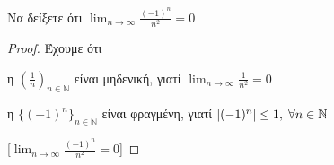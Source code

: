 \begin{example}
  Να δείξετε ότι $ \lim_{n \to \infty} \frac{(-1)^{n}}{n^{2}} = 0 $
  \begin{proof}
    Έχουμε ότι 
    \flushleft\parbox[b]{9.5cm}{\begin{myitemize}
        \item η $ (\frac{1}{n})_{n \in \mathbb{N}} $ είναι μηδενική, γιατί 
          $ \lim_{n \to \infty} \frac{1}{n^{2}} = 0 $ \hfill {}
        \item η $ \{ (-1)^{n} \}_{n \in \mathbb{N}} $ είναι φραγμένη, γιατί
          $ \abs{(-1)^{n}} \leq 1, \; \forall n \in \mathbb{N} $ \hfill {}
    \end{myitemize}}
   [$ \lim_{n \to \infty} \frac{(-1)^{n}}{n^{2}} = 0 $]
  \end{proof}
\end{example}

